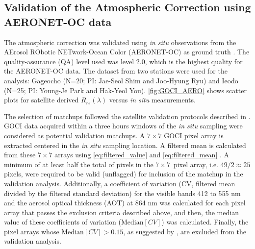 \documentclass[onecolumn,3p,letterpaper,11pt]{elsarticle}
\begin{document}
\subsection{Validation of the Atmospheric Correction using AERONET-OC data}
The atmospheric correction was validated using {\it in situ} observations from the AErosol RObotic NETwork-Ocean Color (AERONET-OC) as ground truth \citep{Zibordi2009}. The quality-assurance (QA) level used was level 2.0, which is the highest quality for the AERONET-OC data. The dataset from two stations were used for the analysis: Gageocho (N=20; PI: Jae-Seol Shim and Joo-Hyung Ryu) and Ieodo (N=25; PI: Young-Je Park and Hak-Yeol You). \autoref{fig:GOCI_AERO} shows scatter plots for satellite derived $R_{rs}(\lambda)$ versus {\it in situ} measurements. 

The selection of matchups followed the satellite validation protocols described in \citet{Bailey2006}. GOCI data acquired within a three hours windows of the {\it in situ} sampling were considered as potential validation matchups. A $7\times7$ GOCI pixel array is extracted centered in the {\it in situ} sampling location.
A filtered mean is calculated from these $7\times7$ arrays using \autoref{eq:filtered_value} and \autoref{eq:filtered_mean} \citep{Bailey2006}. A minimum of at least half the total of pixels in the $7\times7$~pixel array, i.e. $49/2\approx25$ pixels, were required to be valid (unflagged) for inclusion of the matchup in the validation analysis. Additionally, a coefficient of variation (CV, filtered mean divided by the filtered standard deviation) for the visible bands 412 to 555 nm and the aerosol optical thickness (AOT) at 864 nm was calculated for each pixel array that passes the exclusion criteria described above, and then, the median value of these coefficients of variation ($\text{Median}[CV]$) was calculated. Finally, the pixel arrays whose $\text{Median}[CV]>0.15$, as suggested by \citep{Bailey2006}, are excluded from the validation analysis.
\end{document}

